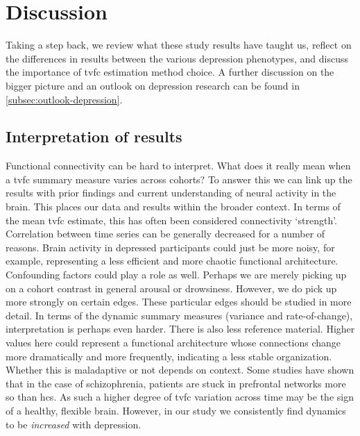 \clearpage
\section{Discussion}
\label{sec:ukb-discussion}

Taking a step back, we review what these study results have taught us, reflect on the differences in results between the various depression phenotypes, and discuss the importance of \gls{tvfc} estimation method choice.
A further discussion on the bigger picture and an outlook on depression research can be found in \cref{subsec:outlook-depression}.

\subsection{Interpretation of results}

Functional connectivity can be hard to interpret.
What does it really mean when a \gls{tvfc} summary measure varies across cohorts?
To answer this we can link up the results with prior findings and current understanding of neural activity in the brain.
This places our data and results within the broader context.
%
In terms of the mean \gls{tvfc} estimate, this has often been considered connectivity `strength'.
Correlation between time series can be generally decreased for a number of reasons.
Brain activity in depressed participants could just be more noisy, for example, representing a less efficient and more chaotic functional architecture.
Confounding factors could play a role as well.
Perhaps we are merely picking up on a cohort contrast in general arousal or drowsiness.
However, we do pick up more strongly on certain edges.
These particular edges should be studied in more detail.
%
In terms of the dynamic summary measures (variance and rate-of-change), interpretation is perhaps even harder.
There is also less reference material.
Higher values here could represent a functional architecture whose connections change more dramatically and more frequently, indicating a less stable organization.
Whether this is maladaptive or not depends on context.
Some studies have shown that in the case of schizophrenia, patients are stuck in prefrontal networks more so than \glspl{hc}.
As such a higher degree of \gls{tvfc} variation across time may be the sign of a healthy, flexible brain.
However, in our study we consistently find dynamics to be \emph{increased} with depression.

